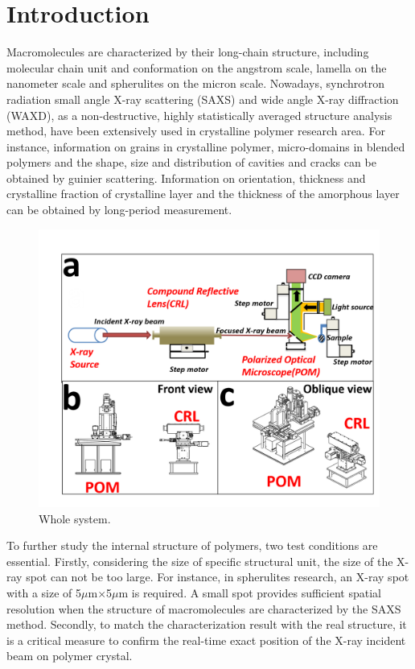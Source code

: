 \documentclass{Head}
\begin{document}
\tableofcontents
\linenumbers
\section{Introduction}
Macromolecules are characterized by their long-chain structure, including molecular chain unit and conformation on the angstrom scale, lamella on the nanometer scale and spherulites on the micron scale.
Nowadays, synchrotron radiation small angle X-ray scattering (SAXS) and wide angle X-ray diffraction (WAXD), as a non-destructive, highly statistically averaged structure analysis method, have been extensively used in crystalline polymer research area.
For instance, information on grains in crystalline polymer, micro-domains in blended polymers and the shape, size and distribution of cavities and cracks can be obtained by guinier scattering.
Information on orientation, thickness and crystalline fraction of crystalline layer and the thickness of the amorphous layer can be obtained by long-period measurement.
\begin{figure}
    \centering
    \includegraphics[scale=0.5]{Figures/Fig1WholeSystem.png}
    \caption{Whole system.}
    \label{WholeSystem}
\end{figure}


To further study the internal structure of polymers, two test conditions are essential.
Firstly, considering the size of specific structural unit, the size of the X-ray spot can not be too large.
For instance, in spherulites research, an X-ray spot with a size of 5$\mu$m$\times$5$\mu$m is required.
A small spot provides sufficient spatial resolution when the structure of macromolecules are characterized by the SAXS method.
Secondly, to match the characterization result with the real structure, it is a critical measure to confirm the real-time exact position of the X-ray incident beam on polymer crystal.
\end{document}
